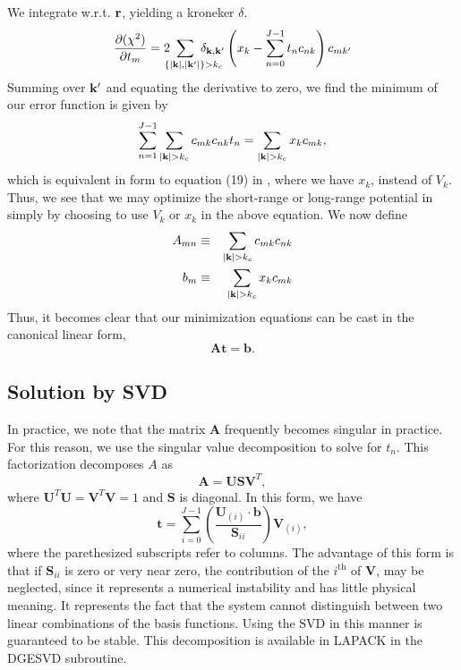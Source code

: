 \documentclass{article}
\begin{document}
We integrate w.r.t. $\mathbf{r}$, yielding a kroneker $\delta$.
\begin{equation}
\frac{\partial (\chi^2)}{\partial t_{m}} =
2 \ns\ns\ns\ns\ns\ns\ns 
\sum_{\ \ \ \ \{|\vk|,|\vk'|\}>k_c} \ns\ns\ns\ns\ns\ns\ns \delta_{\vk, \vk'} 
\left(x_k -\sum_{n=0}^{J-1} t_n c_{nk} \right) c_{mk'}
\end{equation}
Summing over $\mathbf{k}'$ and equating the derivative to zero, we find the
minimum of our error function is given by
\begin{equation}
\sum_{n=1}^{J-1} \sum_{|\vk|>k_c} c_{mk}c_{nk} t_n = 
\sum_{|\vk|>k_c} x_k c_{mk},
\end{equation}
which is equivalent in form to equation (19) in \cite{Natoli}, where
we have $x_k$, instead of $V_k$.  Thus, we see that we may optimize
the short-range or long-range potential in simply by choosing to use
$V_k$ or $x_k$ in the above equation.  We now define
\begin{eqnarray}
A_{mn} & \equiv & \sum_{|\vk|>k_c} c_{mk} c_{nk} \\
b_{m} & \equiv & \sum_{|\vk|>k_c} x_k c_{mk}
\end{eqnarray}
Thus, it becomes clear that our minimization equations can be cast in
the canonical linear form,
\newcommand{\bA}{\mathbf{A}}
\newcommand{\bU}{\mathbf{U}}
\newcommand{\bV}{\mathbf{V}}
\newcommand{\bb}{\mathbf{b}}
\newcommand{\bS}{\mathbf{S}}
\begin{equation}
\bA\mathbf{t} = \mathbf{b}.
\end{equation}
\subsection{Solution by SVD}
In practice, we note that the matrix $\bA$ frequently becomes singular
in practice.  For this reason, we use the singular value decomposition
to solve for $t_n$.  This factorization decomposes $A$ as
\begin{equation}
\bA = \bU \bS \bV^T,
\end{equation}
where $\bU^T\bU = \bV^T\bV = 1$ and $\bS$ is diagonal.  In this form, we have
\begin{equation}
\mathbf{t} = \sum_{i=0}^{J-1} \left( \frac{\bU_{(i)} \cdot
  \bb}{\bS_{ii}} \right) \bV_{(i)},
\end{equation}
where the parethesized subscripts refer to columns.  The advantage of
this form is that if $\bS_{ii}$ is zero or very near zero, the
contribution of the $i^{\text{th}}$ of $\bV$, may be neglected, since
it represents a numerical instability and has little physical
meaning.  It represents the fact that the system cannot distinguish
between two linear combinations of the basis functions.  Using the SVD
in this manner is guaranteed to be stable.  This decomposition is
available in LAPACK in the DGESVD subroutine.
\end{document}
